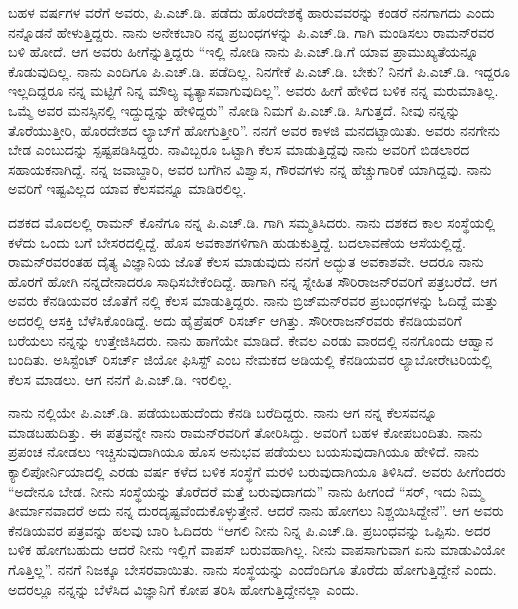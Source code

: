 ಬಹಳ ವರ್ಷಗಳ ವರೆಗೆ ಅವರು, ಪಿ.ಎಚ್.ಡಿ. ಪಡೆದು ಹೊರದೇಶಕ್ಕೆ ಹಾರುವವರನ್ನು ಕಂಡರೆ ನನಗಾಗದು ಎಂದು ನನ್ನೊಡನೆ ಹೇಳುತ್ತಿದ್ದರು. ನಾನು ಅನೇಕಬಾರಿ ನನ್ನ ಪ್ರಬಂಧಗಳನ್ನು ಪಿ.ಎಚ್.ಡಿ. ಗಾಗಿ ಮಂಡಿಸಲು ರಾಮನ್‍ರವರ ಬಳಿ ಹೋದೆ. ಆಗ ಅವರು ಹೀಗೆನ್ನುತ್ತಿದ್ದರು \enginline{-}“ಇಲ್ಲಿ ನೋಡಿ ನಾನು ಪಿ.ಎಚ್.ಡಿ.ಗೆ ಯಾವ ಪ್ರಾಮುಖ್ಯತೆಯನ್ನೂ ಕೊಡುವುದಿಲ್ಲ. ನಾನು ಎಂದಿಗೂ ಪಿ.ಎಚ್.ಡಿ. ಪಡೆದಿಲ್ಲ. ನಿನಗೇಕೆ ಪಿ.ಎಚ್.ಡಿ. ಬೇಕು? ನಿನಗೆ ಪಿ.ಎಚ್.ಡಿ. ಇದ್ದರೂ ಇಲ್ಲದಿದ್ದರೂ ನನ್ನ ಮಟ್ಟಿಗೆ ನಿನ್ನ ಮೌಲ್ಯ ವ್ಯತ್ಯಾಸವಾಗುವುದಿಲ್ಲ”. ಅವರು ಹೀಗೆ ಹೇಳಿದ ಬಳಿಕ ನನ್ನ ಮರುಮಾತಿಲ್ಲ. ಒಮ್ಮೆ ಅವರ ಮನಸ್ಸಿನಲ್ಲಿ ಇದ್ದುದ್ದನ್ನು ಹೇಳಿದ್ದರು” ನೋಡಿ ನಿಮಗೆ ಪಿ.ಎಚ್.ಡಿ. ಸಿಗುತ್ತದೆ. ನೀವು ನನ್ನನ್ನು ತೊರೆಯುತ್ತೀರಿ, ಹೊರದೇಶದ ಲ್ಯಾಬ್‍ಗೆ ಹೋಗುತ್ತೀರಿ”. ನನಗೆ ಅವರ ಕಾಳಜಿ ಮನದಟ್ಟಾಯಿತು. ಅವರು ನನಗೇನು ಬೇಡ ಎಂಬುದನ್ನು ಸ್ಪಷ್ಟಪಡಿಸಿದ್ದರು. ನಾವಿಬ್ಬರೂ ಒಟ್ಟಾಗಿ ಕೆಲಸ ಮಾಡುತ್ತಿದ್ದೆವು ನಾನು ಅವರಿಗೆ ಬಿಡಲಾರದ ಸಹಾಯಕನಾಗಿದ್ದೆ. ನನ್ನ ಜವಾಬ್ದಾರಿ, ಅವರ ಬಗೆಗಿನ ವಿಶ್ವಾಸ, ಗೌರವಗಳು ನನ್ನ ಹೆಚ್ಚುಗಾರಿಕೆ ಯಾಗಿದ್ದವು. ನಾನು ಅವರಿಗೆ ಇಷ್ಟವಿಲ್ಲದ ಯಾವ ಕೆಲಸವನ್ನೂ ಮಾಡಿರಲಿಲ್ಲ.

 ದಶಕದ ಮೊದಲಲ್ಲಿ ರಾಮನ್ ಕೊನೆಗೂ ನನ್ನ ಪಿ.ಎಚ್.ಡಿ. ಗಾಗಿ ಸಮ್ಮತಿಸಿದರು. ನಾನು ದಶಕದ ಕಾಲ ಸಂಸ್ಥೆಯಲ್ಲಿ ಕಳೆದು ಒಂದು ಬಗೆ ಬೇಸರದಲ್ಲಿದ್ದೆ. ಹೊಸ ಅವಕಾಶಗಳಿಗಾಗಿ ಹುಡುಕುತ್ತಿದ್ದೆ. ಬದಲಾವಣೆಯ ಆಸೆಯಲ್ಲಿದ್ದೆ. ರಾಮನ್‍ರವರಂತಹ ದೈತ್ಯ ವಿಜ್ಞಾನಿಯ ಜೊತೆ ಕೆಲಸ ಮಾಡುವುದು ನನಗೆ ಅದ್ಭುತ ಅವಕಾಶವೇ. ಆದರೂ ನಾನು ಹೊರಗೆ ಹೋಗಿ ನನ್ನದೇನಾದರೂ ಸಾಧಿಸಬೇಕೆಂದಿದ್ದೆ. ಹಾಗಾಗಿ ನನ್ನ ಸ್ನೇಹಿತ ಸೌರಿರಾಜನ್‍ರವರಿಗೆ ಪತ್ರಬರೆದೆ. ಆಗ ಅವರು ಕೆನಡಿಯವರ ಜೊತೆಗೆ  ನಲ್ಲಿ ಕೆಲಸ ಮಾಡುತ್ತಿದ್ದರು. ನಾನು ಬ್ರಿಜ್‍ಮನ್‍ರವರ ಪ್ರಬಂಧಗಳನ್ನು ಓದಿದ್ದೆ ಮತ್ತು ಅದರಲ್ಲಿ ಆಸಕ್ತಿ ಬೆಳೆಸಿಕೊಂಡಿದ್ದೆ. ಅದು ಹೈಪ್ರೆಷರ್ ರಿಸರ್ಚ್ ಆಗಿತ್ತು. ಸೌರೀರಾಜನ್‍ರವರು ಕೆನಡಿಯವರಿಗೆ ಬರೆಯಲು ನನ್ನನ್ನು ಉತ್ತೇಜಿಸಿದರು. ನಾನು ಹಾಗೆಯೇ ಮಾಡಿದೆ. ಕೇವಲ ಎರಡು ವಾರದಲ್ಲಿ ನನಗೊಂದು ಆಹ್ವಾನ ಬಂದಿತು. ಅಸಿಸ್ಟೆಂಟ್ ರಿಸರ್ಚ್ ಜಿಯೋ ಫಿಸಿಸ್ಟ್ ಎಂಬ ನೇಮಕದ ಅಡಿಯಲ್ಲಿ ಕೆನಡಿಯವರ ಲ್ಯಾಬೋರೇಟರಿಯಲ್ಲಿ ಕೆಲಸ ಮಾಡಲು. ಆಗ ನನಗೆ ಪಿ.ಎಚ್.ಡಿ. ಇರಲಿಲ್ಲ.

ನಾನು  ನಲ್ಲಿಯೇ ಪಿ.ಎಚ್.ಡಿ. ಪಡೆಯಬಹುದೆಂದು ಕೆನಡಿ ಬರೆದಿದ್ದರು. ನಾನು ಆಗ ನನ್ನ ಕೆಲಸವನ್ನೂ ಮಾಡಬಹುದಿತ್ತು. ಈ ಪತ್ರವನ್ನೇ ನಾನು ರಾಮನ್‍ರವರಿಗೆ ತೋರಿಸಿದ್ದು. ಅವರಿಗೆ ಬಹಳ ಕೋಪಬಂದಿತು. ನಾನು ಪ್ರಪಂಚ ನೋಡಲು ಇಚ್ಚಿಸುವುದಾಗಿಯೂ ಹೊಸ ಅನುಭವ ಪಡೆಯಲು ಬಯಸುವುದಾಗಿಯೂ ಹೇಳಿದೆ. ನಾನು ಕ್ಯಾಲಿಪೋರ್ನಿಯಾದಲ್ಲಿ ಎರಡು ವರ್ಷ ಕಳೆದ ಬಳಿಕ ಸಂಸ್ಥೆಗೆ ಮರಳಿ ಬರುವುದಾಗಿಯೂ ತಿಳಿಸಿದೆ. ಅವರು ಹೀಗೆಂದರು “ಅದೇನೂ ಬೇಡ. ನೀನು ಸಂಸ್ಥೆಯನ್ನು ತೊರೆದರೆ ಮತ್ತೆ ಬರುವುದಾಗದು” ನಾನು ಹೀಗಂದೆ “ಸರ್, ಇದು ನಿಮ್ಮ ತೀರ್ಮಾನವಾದರೆ ಅದು ನನ್ನ ದುರದೃಷ್ಟವೆಂದುಕೊಳ್ಳುತ್ತೇನೆ. ಆದರೆ ನಾನು ಹೋಗಲು ನಿಶ್ಚಯಿಸಿದ್ದೇನೆ”. ಆಗ ಅವರು ಕೆನಡಿಯವರ ಪತ್ರವನ್ನು ಹಲವು ಬಾರಿ ಓದಿದರು “ಆಗಲಿ ನೀನು ನಿನ್ನ ಪಿ.ಎಚ್.ಡಿ. ಪ್ರಬಂಧವನ್ನು ಒಪ್ಪಿಸು. ಅದರ ಬಳಿಕ ಹೋಗಬಹುದು ಆದರೆ ನೀನು ಇಲ್ಲಿಗೆ ವಾಪಸ್ ಬರುವಹಾಗಿಲ್ಲ. ನೀನು ವಾಪಸಾಗುವಾಗ ಏನು ಮಾಡುವಿಯೋ ಗೊತ್ತಿಲ್ಲ”. ನನಗೆ ನಿಜಕ್ಕೂ ಬೇಸರವಾಯಿತು. ನಾನು ಸಂಸ್ಥೆಯನ್ನು ಎಂದೆಂದಿಗೂ ತೊರೆದು ಹೋಗುತ್ತಿದ್ದೇನೆ ಎಂದು. ಅದರಲ್ಲೂ ನನ್ನನ್ನು ಬೆಳೆಸಿದ ವಿಜ್ಞಾನಿಗೆ ಕೋಪ ತರಿಸಿ ಹೋಗುತ್ತಿದ್ದೇನಲ್ಲಾ ಎಂದು.

